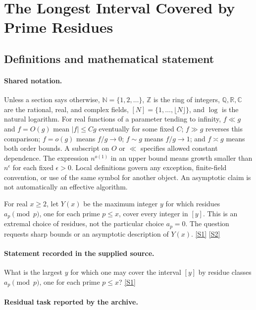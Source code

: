 \documentclass[11pt,a4paper]{article}
\newcommand{\N}{\mathbb{N}}
\newcommand{\Z}{\mathbb{Z}}
\newcommand{\Q}{\mathbb{Q}}
\newcommand{\R}{\mathbb{R}}
\newcommand{\C}{\mathbb{C}}
\newcommand{\sref}[2]{\hyperlink{source:#1:#2}{[S#2]}}
\begin{document}
\section{The Longest Interval Covered by Prime Residues}\label{statement}


\subsection{Definitions and mathematical statement}

\paragraph{Shared notation.}Unless a section says otherwise, $\N=\{1,2,\ldots\}$,
$\Z$ is the ring of integers, $\Q,\R,\C$ are the rational, real, and complex
fields, $[N]=\{1,\ldots,\lfloor N\rfloor\}$, and $\log$ is the natural
logarithm. For real functions of a parameter tending to infinity,
$f\ll g$ and $f=O(g)$ mean $|f|\leq Cg$ eventually for some fixed $C$;
$f\gg g$ reverses this comparison; $f=o(g)$ means $f/g\to0$;
$f\sim g$ means $f/g\to1$; and $f\asymp g$ means both order bounds.
A subscript on $O$ or $\ll$ specifies allowed constant dependence.
The expression $n^{o(1)}$ in an upper bound means growth smaller than
$n^\epsilon$ for each fixed $\epsilon>0$. Local definitions govern any
exception, finite-field convention, or use of the same symbol for another
object. An asymptotic claim is not automatically an effective algorithm.



For real $x\geq2$, let $Y(x)$ be the maximum integer $y$ for which residues $a_p\pmod p$, one for each prime $p\leq x$, cover every integer in $[y]$. This is an extremal choice of residues, not the particular choice $a_p=0$. The question requests sharp bounds or an asymptotic description of $Y(x)$. \sref{statement}{1} \sref{statement}{2}

\paragraph{Statement recorded in the supplied source.}
What is the largest $y$ for which one may cover the interval $[y]$ by residue classes $a_p \pmod p$, one for each prime $p \leq x$? \sref{statement}{1}

\paragraph{Residual task reported by the archive.}
\end{document}
